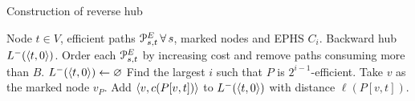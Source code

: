 \begin{algorithm}
	\small
	\caption{Construction of reverse hub}
	\label{alg:reversehub}
	\begin{algorithmic}[1]
		\Require Node $t\in V$, efficient paths $\mathcal{P}_{s,t}^E\,\forall\,s$, marked nodes and EPHS $C_i$.
		\Ensure Backward hub $L^-(\langle t,0\rangle)$.
		\State Order each $\mathcal{P}_{s,t}^E$ by increasing cost and remove paths consuming more than $B$.
		\State $L^-(\langle t,0\rangle)\gets \varnothing$
		\State Find the largest $i$ such that $P$ is $2^{i-1}$-efficient.
		\State Take $v$ as the marked node $v_P$.
		\State Add $\langle v,c(P[v,t])\rangle$ to $L^-(\langle t,0\rangle)$ with distance $\ell(P[v,t])$.
		\EndFor
		\EndFor
	\end{algorithmic}
\end{algorithm}


